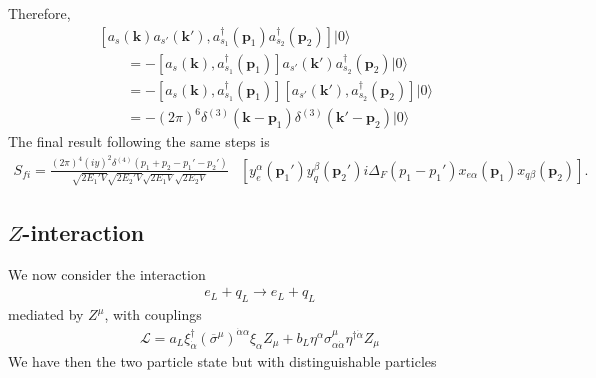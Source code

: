 Therefore,
\begin{align}
&\left[ a_s(\mathbf{k})a_{s'}(\mathbf{k}'),a_{s_1}^\dagger(\mathbf{p}_1)a_{s_2}^\dagger(\mathbf{p}_2)\right] |0\rangle \nonumber\\
&\qquad=
-
 \left[ a_s(\mathbf{k}),a_{s_1}^\dagger(\mathbf{p}_1)\right]a_{s'}(\mathbf{k}')a_{s_2}^\dagger(\mathbf{p}_2) |0\rangle \nonumber\\
&\qquad=-
  \left[ a_s(\mathbf{k}),a_{s_1}^\dagger(\mathbf{p}_1)\right] \left[ a_{s'}(\mathbf{k}'),a_{s_2}^\dagger(\mathbf{p}_2)  \right] |0\rangle \nonumber\\
&\qquad= -(2\pi)^6  
    \delta^{(3)}(\mathbf{k}-\mathbf{p}_1)\delta^{(3)}(\mathbf{k}'-\mathbf{p}_2)|0\rangle
\end{align}
The final result following the same steps is
\begin{align}
\label{eq:hdee}
     S_{fi}
    =\frac{(2\pi)^4(iy)^2\delta^{(4)}\left(p_1+p_2-p_1'-p_2'\right) }{\sqrt{2 E_1'V}\sqrt{2 E_2'V}\sqrt{2 E_1V}\sqrt{2 E_2V}}
  &\left[ y^{\alpha}_e(\mathbf{p}_1')y^{\beta}_q(\mathbf{p}_2')i\Delta_F(p_1-p_1')x_{e \alpha}(\mathbf{p}_1)x_{q \beta}(\mathbf{p}_2)\right].
\end{align}






\subsection{$Z$-interaction}

We now consider the interaction
\begin{align}
  e_L+q_L \to e_L+q_L
\end{align}
mediated by $Z^{\mu}$, with couplings
\begin{align}
\label{eq:38}
\mathcal{L}=a_L \xi^{\dagger}_{\dot{\alpha}}\left( \overline{\sigma}^{\mu} \right)^{\dot{\alpha}\alpha}\xi_{\alpha} Z_{\mu}
+b_L \eta^{\alpha} \sigma^{\mu}_{\alpha\dot{\alpha}} \eta^{\dagger\dot{\alpha}} Z_{\mu}
\end{align}
We have then the two particle state but with distinguishable particles 

